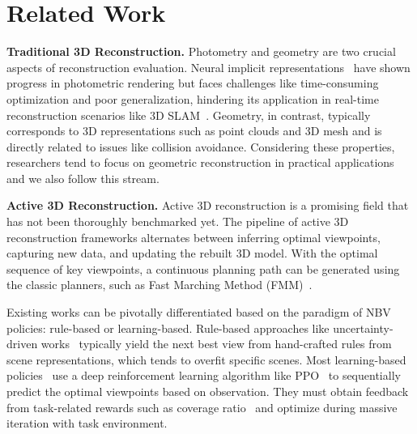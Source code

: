 \section{Related Work}
\label{sec:related work}
    \noindent\textbf{Traditional 3D Reconstruction.}
    Photometry and geometry are two crucial aspects of reconstruction evaluation. Neural implicit representations~\citep{park2019deepsdf, mildenhall2020nerf} have shown progress in photometric rendering but faces challenges like time-consuming optimization and poor generalization, hindering its application in real-time reconstruction scenarios like 3D SLAM~\citep{sucar2021imap, iSDF2022, zhu2022nice, rosinol2022nerf}. Geometry, in contrast, typically corresponds to 3D representations such as point clouds and 3D mesh and is directly related to issues like collision avoidance. Considering these properties, researchers tend to focus on geometric reconstruction in practical applications and we also follow this stream.


    \noindent\textbf{Active 3D Reconstruction.}
    Active 3D reconstruction is a promising field that has not been thoroughly benchmarked yet. The pipeline of active 3D reconstruction frameworks alternates between inferring optimal viewpoints, capturing new data, and updating the rebuilt 3D model. With the optimal sequence of key viewpoints, a continuous planning path can be generated using the classic planners, such as Fast Marching Method (FMM)~\citep{sethian1996fast}.  %

    Existing works can be pivotally differentiated based on the paradigm of NBV policies: rule-based or learning-based.
    Rule-based approaches like uncertainty-driven works~\citep{isler2016information, lee2022uncertainty, zhan2022activermap, ran2023neurar} typically yield the next best view from hand-crafted rules from scene representations, which tends to overfit specific scenes. 
    Most learning-based policies~\citep{chenlearning, chaplotlearning, peralta2020next} use a deep reinforcement learning algorithm like PPO~\citep{schulman2017proximal} to sequentially predict the optimal viewpoints based on observation. They must obtain feedback from task-related rewards such as coverage ratio~\citep{peralta2020next, guedonscone} and optimize during massive iteration with task environment.

